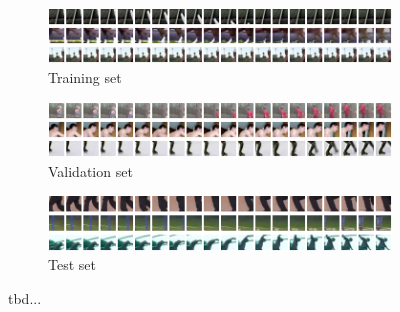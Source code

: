 \begin{figure}[htpb]
\centering
\begin{subfigure}{1.0\textwidth}
  \centering
  \includegraphics[width=1.0\linewidth]{figures/ds/ucf_train.png}
  \caption{Training set}
  \label{fig:ucf_train}
  \vspace{.1cm}
\end{subfigure}
\begin{subfigure}{1.0\textwidth}
  \centering
  \includegraphics[width=1.0\linewidth]{figures/ds/ucf_valid.png}
  \caption{Validation set}
  \label{fig:ucf_valid}
  \vspace{.1cm}
\end{subfigure}
\begin{subfigure}{1.0\textwidth}
  \centering
  \includegraphics[width=1.0\linewidth]{figures/ds/ucf_test.png}
  \caption{Test set}
  \label{fig:ucf_test}
\end{subfigure}
\caption[UCF-101 Image Sequence Samples]{tbd...}
\label{fig:ucf}
\end{figure}




